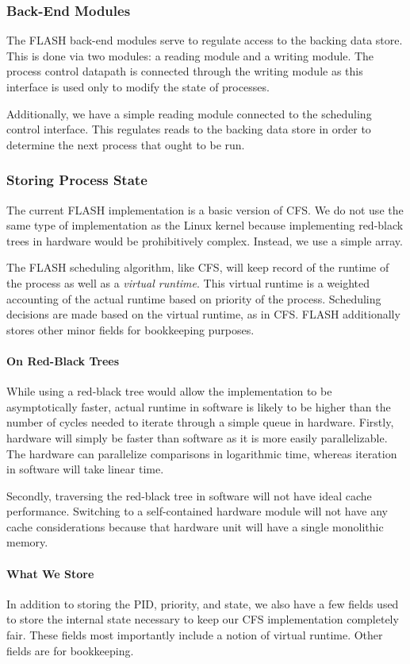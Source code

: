 \documentclass{sig-alternate-10pt}
\begin{document}
\subsubsection{Back-End Modules}
The FLASH back-end modules serve to regulate access to the backing data
store.  This is done via two modules: a reading module and a writing module.
The process control datapath is connected through the writing module as this
interface is used only to modify the state of processes.

Additionally, we have a simple reading module connected to the scheduling
control interface.  This regulates reads to the backing data store in order
to determine the next process that ought to be run.

\subsubsection{Storing Process State}
The current FLASH implementation is a basic version of CFS.  We do not use
the same type of implementation as the Linux kernel because implementing
red-black trees in hardware would be prohibitively complex.  Instead, we use
a simple array.

The FLASH scheduling algorithm, like CFS, will keep record of the runtime of
the process as well as a \emph{virtual runtime}.  This virtual runtime is
a weighted accounting of the actual runtime based on priority of the
process.  Scheduling decisions are made based on the virtual runtime, as in
CFS.  FLASH additionally stores other minor fields for bookkeeping purposes.

\paragraph{On Red-Black Trees}
While using a red-black tree would allow the implementation to be
asymptotically faster, actual runtime in software is likely to be higher than
the number of cycles needed to iterate through a simple queue in hardware.  Firstly, hardware
will simply be faster than software as it is more easily parallelizable.
The hardware can parallelize comparisons in logarithmic time, whereas iteration in software will take linear time.

Secondly, traversing the red-black tree in software will not have ideal cache
performance. Switching to a self-contained hardware module will not have any
cache considerations because that hardware unit will have a single
monolithic memory.

\paragraph{What We Store}
In addition to storing the PID, priority, and state, we also have a few
fields used to store the internal state necessary to keep our CFS implementation
completely fair.  These fields most importantly include a notion of virtual
runtime.  Other fields are for bookkeeping.
\end{document}
